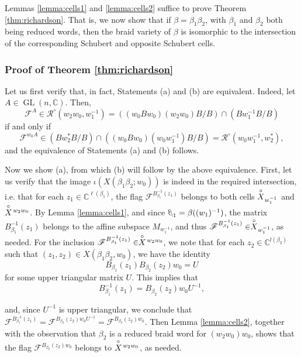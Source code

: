 \documentclass[10pt]{amsart}
\theoremstyle{plain}
\theoremstyle{definition}
\theoremstyle{remark}
\numberwithin{equation}{section}
\newcommand{\C}{\mathbb{C}}
\newcommand{\GL}{\operatorname{GL}}
\renewcommand{\C}{\mathbb{C}}
\newcommand{\cF}{\mathscr{F}}
\newcommand{\schub}{\buildrel\circ \over X}
\newcommand{\rich}[2]{\mathcal{R}^{\circ}\!(#2,#1)}
\newcommand{\MG}[1]{{\color{teal}{{\bf Misha}: #1}}}
\DeclareRobustCommand{\ateb}{\text{\reflectbox{$\beta$}}}
\begin{document}
\noindent Lemmas \ref{lemma:cells1} and \ref{lemma:cells2} suffice to prove Theorem \ref{thm:richardson}. That is, we now show that if $\beta = \beta_1\beta_2$, with $\beta_1$ and $\beta_2$ both being reduced words, then the braid variety of $\beta$ is isomorphic to the intersection of the corresponding Schubert and opposite Schubert cells.


\subsubsection{Proof of Theorem \ref{thm:richardson}}\label{sssec:thm_rich}
Let us first verify that, in fact, Statements (a) and (b) are equivalent. Indeed, let $A \in \GL(n, \C)$. Then,
\[
\cF^{A} \in \rich{w_1^{-1}}{w_2w_0} = ((w_0Bw_0)(w_2w_0)B/B)\cap(Bw_1^{-1}B/B) 
\]
if and only if
\[
\cF^{w_0A} \in (Bw_2^*B/B)\cap ((w_0Bw_0)(w_0w_1^{-1})B/B) = \rich{w_2^*}{w_0w_1^{-1}},
\]
and the equivalence of Statements (a) and (b) follows. 

Now we show (a), from which (b) will follow by the above equivalence. First, let us verify that the image $\iota(X(\beta_1\beta_2; w_0))$ is indeed in the required intersection, i.e. that for each $z_1 \in \mathbb{C}^{\ell(\beta_1)}$, the flag $\cF^{B_{\beta_1}^{-1}(z_1)}$ belongs to both  cells $\schub_{w_{1}^{-1}}$ and $\schub\!^{w_2w_0}$. By Lemma \ref{lemma:cells1}, and since $\ateb_1 = \beta((w_1)^{-1})$, the matrix $B^{-1}_{\beta_1}(z_1)$ belongs to the affine subspace $M_{w_{1}^{-1}}$, and thus $\cF^{B_{\beta_1}^{-1}(z_1)} \in \schub_{w_{1}^{-1}}$, as needed. For the inclusion $\cF^{B_{\beta_1}^{-1}(z_1)} \in \schub\!^{w_2w_0}$, we note that for each $z_2 \in \mathbb{C}^{l(\beta_2)}$ such that $(z_1, z_2) \in X(\beta_1 \beta_2, w_0)$, we have the identity
	$$
	B_{\beta_{1}}(z_1)B_{\beta_2}(z_2)w_{0} = U
	$$
	\noindent for some upper triangular matrix $U$. This implies that	
	$$
	B_{\beta_1}^{-1}(z_1) = B_{\beta_{2}}(z_2)w_{0}U^{-1},
	$$
	
	\noindent and, since $U^{-1}$ is upper triangular, we conclude that $\cF^{B_{\beta_1}^{-1}(z_1)} = \cF^{ B_{\beta_{2}}(z_2)w_{0}U^{-1}} = \cF^{B_{\beta_{2}}(z_2)w_{0}}$. Then Lemma \ref{lemma:cells2}, together with the observation that $\beta_2$ is a reduced braid word for $(w_2w_0)w_0$, shows that the flag $\cF^{B_{\beta_{2}}(z_2)w_0}$ belongs to $\schub\!^{w_2w_0}$, as needed.  %
 
\end{document}
